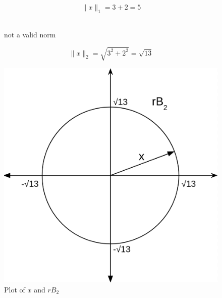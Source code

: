 \documentclass[12pt]{article}
\begin{document}
\begin{enumerate}
\begin{framed}
\[\|x\|_1=3+2=5\]\
\end{framed}

\begin{figure}[h]not a valid norm
\end{figure}

\begin{framed}
\[\|x\|_2=\sqrt{3^2+2^2}=\sqrt{13}\]
\end{framed}
\begin{figure}[h]
    \caption{Plot of $x$ and $rB_2$}
    \centering
    \includegraphics[scale=0.25]{l2.png}
\end{figure}


\end{enumerate}
\end{document}
